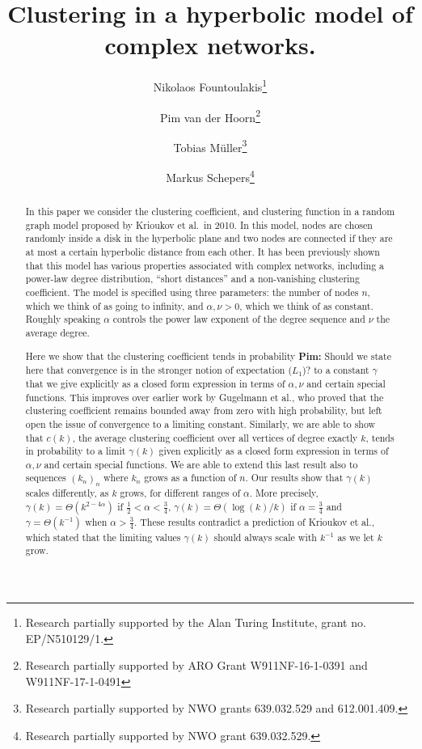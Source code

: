 \documentclass[a4paper,10pt]{article}
\title{Clustering in a hyperbolic model of complex networks.}
\author[1]{Nikolaos Fountoulakis\thanks{Research partially supported by the Alan Turing Institute, grant no. EP/N510129/1.}}
\author[2]{Pim van der Hoorn\thanks{Research partially supported by ARO Grant W911NF-16-1-0391 and W911NF-17-1-0491}}
\author[3]{Tobias M\"{u}ller\thanks{Research partially supported by NWO grants 639.032.529 and 612.001.409.}}
\author[3]{Markus Schepers\thanks{Research partially supported by NWO grant 639.032.529.}}
\affil[1]{ School of Mathematics, University of Birmingham, United Kingdom.}
\affil[2]{Department of Physics, Northeastern University, United States.}
\affil[3]{Bernoulli Institute, University of Groningen, The Netherlands.}
\newcommand{\bigT}[1]{\Theta\left(#1\right)}		%
\newcommand{\1}{\mathds{1}}								%
\newcommand{\OR}[1]{{{\color{orange} #1}}}
\newcommand{\PvdH}[1]{{\OR{{\bf Pim:} #1}}}
\begin{document}
\maketitle

\begin{abstract}
In this paper we consider the clustering coefficient, and clustering function in a random graph model proposed by Krioukov et al.~in 2010. In this model, nodes are chosen randomly inside a disk in the hyperbolic plane and two nodes are connected if they are at most a certain hyperbolic distance from each other. It has been previously shown that this model has various properties associated with complex networks, including a power-law degree distribution, ``short distances'' and a non-vanishing clustering coefficient. The model is specified using three parameters: the number of nodes $n$, which we think of as going to infinity, and $\alpha, \nu > 0$, which we think of as constant. Roughly speaking $\alpha$ controls the power law exponent of the degree sequence and $\nu$ the average degree.

Here we show that the clustering coefficient tends in probability \PvdH{Should we state here that convergence is in the stronger notion of expectation ($L_1$)?} to a constant $\gamma$ that we give explicitly as a closed form expression in terms of $\alpha, \nu$ and certain special functions. This improves over earlier work by Gugelmann et al., who proved that the clustering coefficient remains bounded away from zero with high probability, but left open the issue of convergence to a limiting constant. Similarly, we are able to show that $c(k)$, the average clustering coefficient over all vertices of degree exactly $k$, tends in probability to a limit $\gamma(k)$ given explicitly as a closed form expression in terms of $\alpha, \nu$ and certain special functions. We are able to extend this last result also to sequences $(k_n)_n$ where $k_n$ grows as a function of $n$. Our results show that $\gamma(k)$ scales differently, as $k$ grows, for different ranges of $\alpha$. More precisely, $\gamma(k) = \Theta( k^{2 - 4\alpha})$ if $\frac{1}{2} < \alpha < \frac{3}{4}$, $\gamma(k) = \Theta( \log(k) / k )$ if $\alpha=\frac{3}{4}$ and $\gamma = \bigT{k^{-1}}$ when $\alpha > \frac{3}{4}$. These results contradict a prediction of Krioukov et al., which stated that the limiting values $\gamma(k)$ should always scale with $k^{-1}$ as we let $k$ grow. 
\end{abstract}

\newpage
\end{document}
